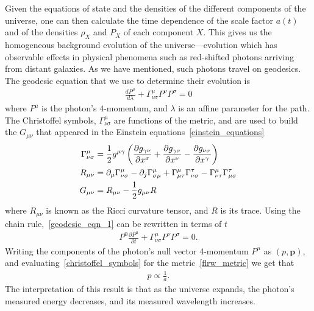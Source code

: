     Given the equations of state and the densities of the different
    components of the universe, one can then calculate the time dependence of the
    scale factor $a(t)$ and of the densities $\rho_X$ and $P_X$ of each component $X$.
    This gives us the homogeneous background evolution of the universe---evolution
    which has observable effects in physical phenomena
    such as red-shifted photons arriving from distant galaxies.
    As we have mentioned, such
    photons travel on geodesics. The geodesic equation that we use to determine
    their evolution is
    \begin{align}\label{geodesic_eqn_1}
        \frac{dP^\mu}{d\lambda}+\Gamma^\mu_{\nu\sigma}P^\nu P^\sigma=0
    \end{align}
    where $P^a$ is the photon's $4$-momentum, and $\lambda$ is an affine parameter
    for the path.
    The Christoffel symbols, $\Gamma^\mu_{\nu\sigma}$ are functions of the
    metric, and are used to build the $G_{\mu\nu}$ that appeared in the Einstein equations~\eqref{einstein_equations}
    \begin{align}
        \Gamma^\mu_{\nu\sigma} &= \frac{1}{2}g^{\mu\gamma}\left(
        \frac{\partial g_{\gamma\nu}}{\partial x^{\sigma}}
        +\frac{\partial g_{\gamma\sigma}}{\partial x^{\nu}}
        -\frac{\partial g_{\nu\sigma}}{\partial x^{\gamma}}
        \right)\label{christoffel_symbols}\\
        R_{\mu \nu} &= \partial_\mu \Gamma^\mu_{\nu \sigma}-\partial_j\Gamma^\mu_{\sigma\mu}+
        \Gamma^\mu_{\mu \tau}\Gamma^\tau_{\nu \sigma}-\Gamma^\mu_{\nu \tau}\Gamma^\tau_{\mu \sigma}\label{ricci_tensor}\\
        G_{\mu\nu} &= R_{\mu\nu} - \frac{1}{2}g_{\mu\nu}R\label{einstein_tensor}
    \end{align}
    where $R_{\mu \nu}$ is known as the Ricci curvature tensor, and $R$ is its trace.
    Using the chain rule,~\eqref{geodesic_eqn_1} can be rewritten in terms of $t$
    \begin{align}
        P^{0}\frac{\partial P^\mu}{\partial t}+\Gamma^\mu_{\nu\sigma}P^\nu P^\sigma=0.
    \end{align}
    Writing the components of the photon's null vector 4-momentum $P^\mu$
    as $(p, \mathbf{p})$, and evaluating~\eqref{christoffel_symbols}
    for the metric~\eqref{flrw_metric} we get that
    \begin{align}\label{eq:redshifting}
        p\propto \frac{1}{a}.
    \end{align}
    The interpretation of this result is that as the universe expands,
    the photon's measured energy decreases, and its measured wavelength increases.


